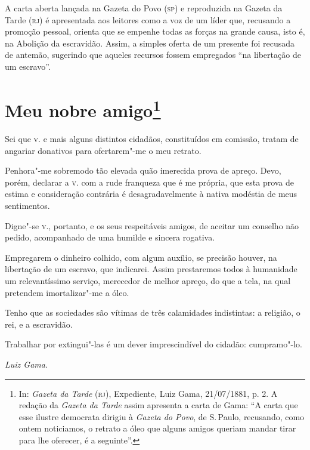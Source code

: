 \paginabranca
\mbox{}\vfill
\thispagestyle{empty}

{\small\noindent
A carta aberta lançada na Gazeta do Povo (\textsc{sp}) e reproduzida na
Gazeta da Tarde (\textsc{rj}) é apresentada aos leitores como a voz de um líder
que, recusando a promoção pessoal, orienta que se empenhe todas as
forças na grande causa, isto é, na Abolição da escravidão. Assim, a
simples oferta de um presente foi recusada de antemão, sugerindo que
aqueles recursos fossem empregados ``na libertação de um escravo''. }

\chapter{Meu nobre amigo\footnote[*]{In: \emph{Gazeta da Tarde} (\textsc{rj}),
  Expediente, Luiz Gama, 21/07/1881, p. 2. A redação da \emph{Gazeta da
  Tarde} assim apresenta a carta de Gama: ``A carta que esse ilustre
  democrata dirigiu à \emph{Gazeta do Povo}, de S.\,Paulo, recusando,
  como ontem noticiamos, o retrato a óleo que alguns amigos queriam
  mandar tirar para lhe oferecer, é a seguinte''.}}


Sei que \textsc{v}. e mais alguns distintos cidadãos, constituídos em comissão, tratam de angariar donativos para ofertarem"-me o meu retrato.

Penhora"-me sobremodo tão elevada quão imerecida prova de apreço. Devo,
porém, declarar a \textsc{v}. com a rude franqueza que é me própria, que esta
prova de estima e consideração contrária é desagradavelmente à nativa
modéstia de meus sentimentos.

Digne"-se \textsc{v}., portanto, e os seus respeitáveis amigos, de aceitar um
conselho não pedido, acompanhado de uma humilde e sincera rogativa.

Empregarem o dinheiro colhido, com algum auxílio, se precisão houver, na
libertação de um escravo, que indicarei. Assim prestaremos todos à
humanidade um relevantíssimo serviço, merecedor de melhor apreço, do que
a tela, na qual pretendem imortalizar"-me a óleo.

Tenho que as sociedades são vítimas de três calamidades indistintas: a
religião, o rei, e a escravidão.

Trabalhar por extingui"-las é um dever imprescindível do cidadão:
cumpramo"-lo.


\hfill\emph{Luiz Gama}.

